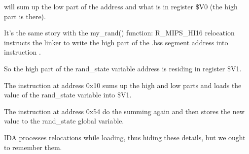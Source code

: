 \SW will sum up the low part of the address and what is in register \$V0 (the high part is there).

It's the same story with the my\_rand() function: R\_MIPS\_HI16 relocation instructs the linker to write the high part
of the .bss segment address into instruction \LUI.

So the high part of the rand\_state variable address is residing in register \$V1.

The \LW instruction at address 0x10 sums up the high and low parts and loads the value of the rand\_state 
variable into \$V1.

The \SW instruction at address 0x54 do the summing again and then stores the new value 
to the rand\_state global variable.

IDA processes relocations while loading, thus hiding these details,
but we ought to remember them.

